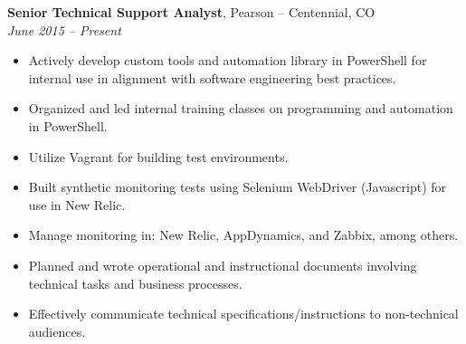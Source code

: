 {\bf Senior Technical Support Analyst}, Pearson – Centennial, CO\\
{\it June 2015 – Present}
\begin{itemize}
	\item Actively develop custom tools and automation library in PowerShell for internal use in alignment with software engineering best practices.
	\item Organized and led internal training classes on programming and automation in PowerShell.
	\item Utilize Vagrant for building test environments.
	\item Built synthetic monitoring tests using Selenium WebDriver (Javascript) for use in New Relic.
	\item Manage monitoring in: New Relic, AppDynamics, and Zabbix, among others.
	\item Planned and wrote operational and instructional documents involving technical tasks and business processes.
	\item Effectively communicate technical specifications/instructions to non-technical audiences.
\end{itemize}